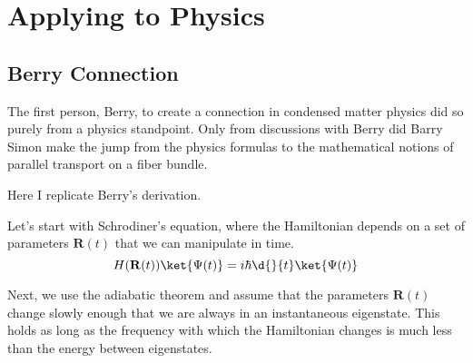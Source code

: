 \chapter{Applying to Physics}
\section{Berry Connection}

The first person, Berry, to create a connection in condensed matter physics did so purely from a physics standpoint.  Only from discussions with Berry did Barry Simon make the jump from the physics formulas to the mathematical notions of parallel transport on a fiber bundle.

Here I replicate Berry's derivation.

Let's start with Schrodiner's equation, where the Hamiltonian depends on a set of parameters $\mathbf{R}(t)$ that we can manipulate in time.
\begin{equation}
  H(\mathbf{R}(t))\ket{\Psi(t)} = i \hbar \d{}{t}\ket{\Psi(t)}
\end{equation}

Next, we use the adiabatic theorem and assume that the parameters $\mathbf{R}(t)$ change slowly enough that we are always in an instantaneous eigenstate.  This holds as long as the frequency with which the Hamiltonian changes is much less than the energy between eigenstates.

